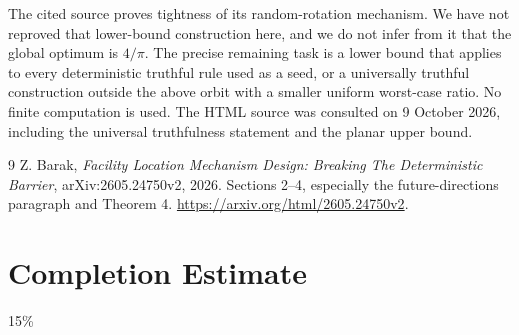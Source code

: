 \documentclass[11pt]{article}
\theoremstyle{definition}
\begin{document}
The cited source proves tightness of its random-rotation mechanism. We
have not reproved that lower-bound construction here, and we do not infer
from it that the global optimum is $4/\pi$. The precise remaining task
is a lower bound that applies to every deterministic truthful rule used
as a seed, or a universally truthful construction outside the above orbit
with a smaller uniform worst-case ratio. No finite computation is used.
The HTML source was consulted on 9 October 2026, including the universal
truthfulness statement and the planar upper bound.
\begin{thebibliography}{9}
 Z. Barak, \emph{Facility Location Mechanism Design:
Breaking The Deterministic Barrier}, arXiv:2605.24750v2, 2026.
Sections 2--4, especially the future-directions paragraph and Theorem 4.
\url{https://arxiv.org/html/2605.24750v2}.
\end{thebibliography}

\section{Completion Estimate}
15\%
\end{document}
